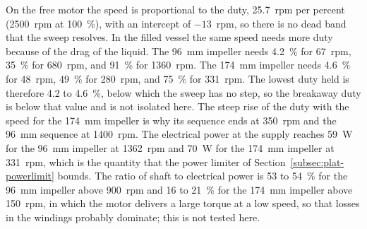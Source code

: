 On the free motor the speed is proportional to the duty, 25.7~rpm per percent (2500~rpm at 100~\%), with an intercept of $-13$~rpm, so there is no dead band that the sweep resolves. In the filled vessel the same speed needs more duty because of the drag of the liquid. The 96~mm impeller needs 4.2~\% for 67~rpm, 35~\% for 680~rpm, and 91~\% for 1360~rpm. The 174~mm impeller needs 4.6~\% for 48~rpm, 49~\% for 280~rpm, and 75~\% for 331~rpm. The lowest duty held is therefore 4.2 to 4.6~\%, below which the sweep has no step, so the breakaway duty is below that value and is not isolated here. The steep rise of the duty with the speed for the 174~mm impeller is why its sequence ends at 350~rpm and the 96~mm sequence at 1400~rpm. The electrical power at the supply reaches 59~W for the 96~mm impeller at 1362~rpm and 70~W for the 174~mm impeller at 331~rpm, which is the quantity that the power limiter of Section~\ref{subsec:plat-powerlimit} bounds. The ratio of shaft to electrical power is 53 to 54~\% for the 96~mm impeller above 900~rpm and 16 to 21~\% for the 174~mm impeller above 150~rpm, in which the motor delivers a large torque at a low speed, so that losses in the windings probably dominate; this is not tested here. %
